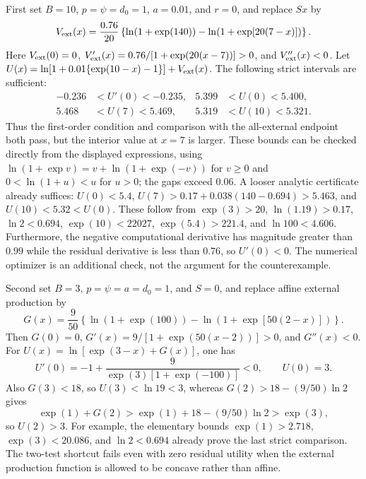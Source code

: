 First set $B=10$, $p=\psi=d_0=1$, $a=0.01$, and $r=0$, and replace
$Sx$ by
\[
 V_{\rm ext}(x)=\frac{0.76}{20}
 \left\{\ln(1+\exp(140))-
             \ln(1+\exp[20(7-x)])\right\}.
\]
Here $V_{\rm ext}(0)=0$,
$V_{\rm ext}'(x)=0.76/[1+\exp(20(x-7))]>0$, and
$V_{\rm ext}''(x)<0$. Let
$U(x)=\ln[1+0.01\{\exp(10-x)-1\}]+V_{\rm ext}(x)$.
The following strict intervals are sufficient:
\begin{align*}
 -0.236&<U'(0)<-0.235, &5.399&<U(0)<5.400,\\
 5.468&<U(7)<5.469, &5.319&<U(10)<5.321.
\end{align*}
Thus the first-order condition and comparison with the all-external
endpoint both pass, but the interior value at $x=7$ is larger.
These bounds can be checked directly from the displayed expressions,
using $\ln(1+\exp v)=v+\ln(1+\exp(-v))$ for $v\geq0$
and $0<\ln(1+u)<u$ for $u>0$; the gaps exceed $0.06$.
A looser analytic certificate already suffices: $U(0)<5.4$,
$U(7)>0.17+0.038(140-0.694)>5.463$, and $U(10)<5.32<U(0)$.
These follow from $\exp(3)>20$, $\ln(1.19)>0.17$,
$\ln2<0.694$, $\exp(10)<22027$, $\exp(5.4)>221.4$, and
$\ln100<4.606$. Furthermore, the negative computational derivative
has magnitude greater than $0.99$ while the residual derivative is
less than $0.76$, so $U'(0)<0$. The numerical optimizer is an
additional check, not the argument for the counterexample.

Second set $B=3$, $p=\psi=a=d_0=1$, and $S=0$, and replace affine
external production by
\[
 G(x)=\frac9{50}\left\{\ln(1+\exp(100))-
                  \ln(1+\exp[50(2-x)])\right\}.
\]
Then $G(0)=0$, $G'(x)=9/[1+\exp(50(x-2))]>0$, and $G''(x)<0$.
For $U(x)=\ln[\exp(3-x)+G(x)]$, one has
\[
 U'(0)=-1+\frac{9}{\exp(3)[1+\exp(-100)]}<0,
 \qquad U(0)=3.
\]
Also $G(3)<18$, so $U(3)<\ln19<3$, whereas
$G(2)>18-(9/50)\ln2$ gives
\[
 \exp(1)+G(2)>\exp(1)+18-(9/50)\ln2>\exp(3),
\]
so $U(2)>3$. For example, the elementary bounds
$\exp(1)>2.718$, $\exp(3)<20.086$, and $\ln2<0.694$
already prove the last strict comparison. The two-test shortcut fails
even with zero residual utility when the external production function
is allowed to be concave rather than affine.

